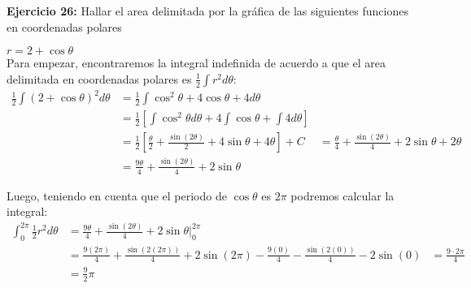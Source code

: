 \documentclass[../main.tex]{subfiles}
\begin{document}
    \question \textbf{Ejercicio 26:} Hallar el area delimitada por la gráfica de las siguientes funciones en coordenadas polares
    \begin{partes}
        \parte $r = 2 + \cos \theta$\\

        Para empezar, encontraremos la integral indefinida de acuerdo a que el area delimitada en coordenadas polares es $\frac{1}{2}\int r^2 d\theta$:
        \begin{align*}
            \frac{1}{2}\int (2+\cos \theta)^2 d\theta &= \frac{1}{2} \int \cos^2\theta + 4 \cos\theta + 4 d\theta\\
            &= \frac{1}{2}\left[\int \cos^2 \theta d\theta + 4\int \cos\theta + \int 4 d\theta \right]\\
            &= \frac{1}{2}\left[\frac{\theta}{2} + \frac{\sin(2 \theta)}{2}+ 4\sin\theta + 4\theta \right] + C
            &= \frac{\theta}{4} + \frac{\sin(2 \theta)}{4} + 2\sin\theta + 2\theta\\
            &= \frac{9\theta}{4} + \frac{\sin(2 \theta)}{4} + 2\sin\theta
        \end{align*} 

        Luego, teniendo en cuenta que el periodo de $\cos \theta$ es $2\pi$ podremos calcular la integral:
        \begin{align*}
            \int_0^{2\pi}\frac{1}{2} r^2 d\theta &= \frac{9\theta}{4} + \frac{\sin(2 \theta)}{4} + 2\sin\theta |_{0}^{2\pi}\\
            &= \frac{9(2\pi)}{4} + \frac{\sin(2 (2\pi))}{4} + 2\sin(2\pi) - \frac{9(0)}{4} - \frac{\sin(2 (0))}{4} - 2\sin(0)
            &= \frac{9 \cdot 2\pi}{4}\\
            &= \frac{9}{2} \pi
        \end{align*}
    \end{partes}
\end{document}

